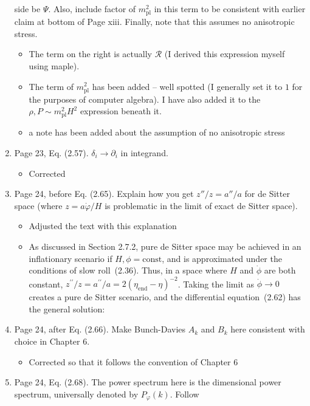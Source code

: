 \documentclass[11pt]{article}
\begin{document}
\begin{enumerate}
  side be $\Psi$. Also, include factor of $m_{\text{pl}}^2$ in this
  term to be consistent with earlier claim at bottom of Page
  xiii. Finally, note that this assumes no anisotropic stress.
  \begin{itemize}
    \item The term on the right is actually $\mathcal{R}$ (I derived this expression myself using maple). 
    \item The term of $m_{\text{pl}}^2$ has been added -- well spotted (I generally set it to $1$ for the purposes of computer algebra). I have also added it to the $\rho,P\sim m_\text{pl}^2 H^2$ expression beneath it.
    \item a note has been added about the assumption of no anisotropic stress
  \end{itemize}
\item Page 23, Eq. (2.57). $\delta_i \rightarrow \partial_i$ in
  integrand.
  \begin{itemize}
    \item Corrected
  \end{itemize}
\item Page 24, before Eq. (2.65). Explain how you get $z''/z = a''/a$
  for de Sitter space (where $z = a\dot{\varphi}/H$ is problematic in
  the limit of exact de Sitter space).
  \begin{itemize}
    \item Adjusted the text with this explanation
    \item As discussed in Section 2.7.2, pure de Sitter space may be achieved in an inflationary scenario if \(H,\phi=\mathrm{const}\), and is approximated under the conditions of slow roll~(2.36).  Thus, in a space where \(H\) and \(\dot\phi\) are both constant, \({z^{\prime\prime}/z = a^{\prime\prime}/a = 2{(\eta_\mathrm{end}-\eta)}^{-2}}\). Taking the limit as \(\dot{\phi}\to0\) creates a pure de Sitter scenario, and the differential equation~(2.62) has the general solution:
  \end{itemize}
\item Page 24, after Eq. (2.66). Make Bunch-Davies $A_k$ and $B_k$
  here consistent with choice in Chapter 6.
  \begin{itemize}
      \item Corrected so that it follows the convention of Chapter 6
  \end{itemize}
\item Page 24, Eq. (2.68). The power spectrum here is the dimensional
  power spectrum, universally denoted by $P_{\varphi}(k)$. Follow

\end{enumerate}
\end{document}
